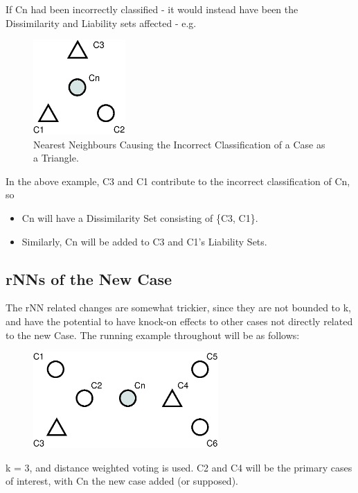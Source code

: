 \documentclass[a4paper,11pt]{report}
\begin{document}
If Cn had been incorrectly classified - it would instead have been the Dissimilarity and Liability sets affected - e.g.

\begin{figure}[h!]
  \centering
	\includegraphics[width=100pt]{./Drawn/NNsIncorrectlyClassify}
\caption{Nearest Neighbours Causing the Incorrect Classification of a Case as a Triangle.}

\end{figure}

In the above example, C3 and C1 contribute to the incorrect classification of Cn, so
\begin{itemize}
	\item Cn will have a Dissimilarity Set consisting of \{C3, C1\}.
	\item Similarly, Cn will be added to C3 and C1's Liability Sets.
\end{itemize}

\subsection{rNNs of the New Case}
The rNN related changes are somewhat trickier, since they are not bounded to k, and have the potential to have knock-on effects to other cases not directly related to the new Case.
The running example throughout will be as follows:

\begin{figure}[h!] 
\centering
\includegraphics[width=200pt]{./Drawn/rNNExample}
\end{figure}

k = 3, and distance weighted voting is used. C2 and C4 will be the primary cases of interest, with Cn the new case added (or supposed).
\end{document}
